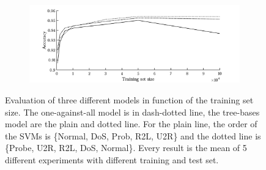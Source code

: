 \begin{figure} [h!]
        \begin{subfigure}[b]{1\textwidth}  
            \centering 
            \includegraphics[width=.98\textwidth]{parts/chap-4/img-svm/lin-svm-1.png}
        \end{subfigure}
        \caption[Comparison of LSVM models.]{Evaluation of three different models in function of the training set size. The one-against-all model is in dash-dotted line, the tree-bases model are the plain and dotted line. For the plain line, the order of the SVMs is \{Normal, DoS, Prob, R2L, U2R\} and the dotted line is \{Probe, U2R, R2L, DoS, Normal\}. Every result is the mean of 5 different experiments with different training and test set.}
        \label{fig:svm-l}
\end{figure}

